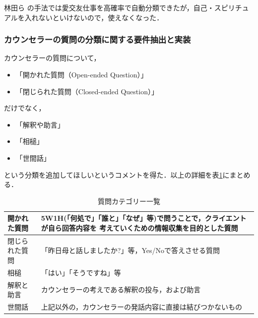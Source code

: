 \documentclass[shuuron]{kuee}
\begin{document}
林田ら\cite{hayashidaJp} \cite{hayashidaEn}の手法では愛交友仕事を高確率で自動分類できたが，自己・スピリチュアルを入れないといけないので，使えなくなった．

\subsubsection{カウンセラーの質問の分類に関する要件抽出と実装}



カウンセラーの質問について，
\begin{itemize}
  \item 「開かれた質問（Open-ended Question）」
  \item 「閉じられた質問（Closed-ended Question）」

\end{itemize}
だけでなく，
\begin{itemize}
  \item 「解釈や助言」
  \item 「相槌」
  \item 「世間話」
\end{itemize}

という分類を追加してほしいというコメントを得た．以上の詳細を表\ref{table:queCate}にまとめる．
\begin{table}
  \caption{質問カテゴリー一覧}
  \label{table:queCate}
  \begin{center}
    \begin{tabular}{|l|p{7cm}|} \hline
      開かれた質問 & 5W1H(「何処で」「誰と」「なぜ」等)で問うことで，クライエントが自ら回答内容を
      考えていくための情報収集を目的とした質問
      \\ \hline
      閉じられた質問  & 「昨日母と話しましたか?」等，Yes/Noで答えさせる質問
      \\ \hline
      相槌 & 「はい」「そうですね」等
      \\ \hline
      解釈と助言  &  カウンセラーの考えである解釈の投与，および助言\\ \hline
      世間話 & 上記以外の，カウンセラーの発話内容に直接は結びつかないもの \\ \hline
    \end{tabular}
  \end{center}
\end{table}

\end{document}
